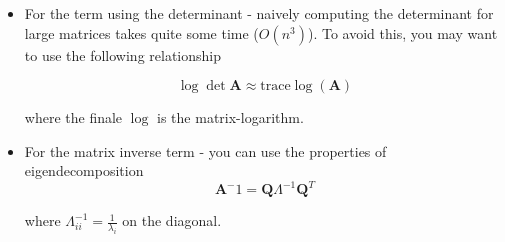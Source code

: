 \documentclass{pset}
\begin{document}
\begin{itemize}
\item For the term using the determinant - naively computing the determinant for large matrices takes quite some time ($O(n^3)$). To avoid this, you may want to use the following relationship 

$$\log \det \mathbf{A} \approx \text{trace} \log(\mathbf{A})$$

where the finale $\log$ is the matrix-logarithm.

\item For the matrix inverse term - you can use the properties of eigendecomposition 
$$\mathbf{A}^-1 = \mathbf{Q}\Lambda^{-1}\mathbf{Q}^T$$

where $\Lambda^{-1}_{ii} = \frac{1}{\lambda_i}$ on the diagonal.
\end{itemize}
\end{document}
